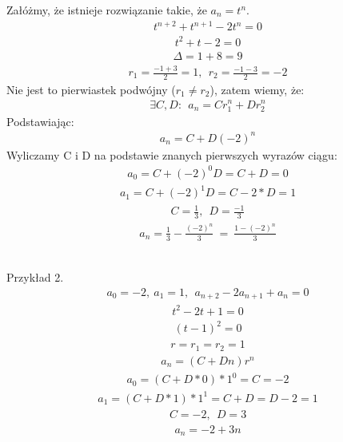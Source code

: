 \documentclass[12pt]{article}
\begin{document}
    Załóżmy, że istnieje rozwiązanie takie, że $a_n = t^n$.
    \begin{align*}
        t^{n+2} + t^{n+1} - 2 t^n = 0
    \end{align*}
    \begin{align*}
        t^2 + t - 2 = 0
    \end{align*}
    \begin{align*}
        \Delta = 1 + 8 = 9
    \end{align*}
    \begin{align*}
        r_1 = \frac{-1 + 3}{2} = 1, ~~ r_2 = \frac{-1 - 3}{2} = -2
    \end{align*}
    Nie jest to pierwiastek podwójny ($r_1 \neq r_2$), zatem wiemy, że:
    \begin{align*}
        \exists C, D: ~~ a_n = C r_1^n + D r_2^n
    \end{align*}
    Podstawiając:
    \begin{align*}
        a_n = C + D (-2)^n
    \end{align*}
    Wyliczamy C i D na podstawie znanych pierwszych wyrazów ciągu:
    \begin{align*}
        a_0 = C + (-2)^0 D = C + D = 0
    \end{align*}
    \begin{align*}
        a_1 = C + (-2)^1 D = C - 2*D = 1
    \end{align*}
    \begin{align*}
        C = \frac{1}{3}, ~~ D = \frac{-1}{3}
    \end{align*}
    \begin{align*}
        a_n = \frac{1}{3} - \frac{(-2)^n}{3} ~ = ~ \frac{1 - (-2)^n}{3}
    \end{align*}

    \hfill \\

    Przykład 2.
    \begin{align*}
        a_0 = -2, ~ a_1 = 1, ~~ a_{n+2} - 2 a_{n+1} + a_n = 0
    \end{align*}
    \begin{align*}
        t^2 - 2t + 1 = 0
    \end{align*}
    \begin{align*}
        (t - 1)^2 = 0
    \end{align*}
    \begin{align*}
        r = r_1 = r_2 = 1
    \end{align*}
    \begin{align*}
        a_n = (C + Dn)r^n
    \end{align*}
    \begin{align*}
        a_0 = (C + D*0)*1^0 = C = -2
    \end{align*}
    \begin{align*}
        a_1 = (C + D*1)*1^1 = C + D = D - 2 = 1
    \end{align*}
    \begin{align*}
        C = -2, ~~ D = 3
    \end{align*}
    \begin{align*}
        a_n = -2 + 3n
    \end{align*}
\end{document}
